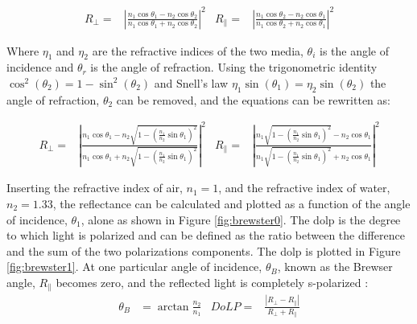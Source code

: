 \begin{align}
    R_\perp =         & \left|{\frac {n_{1}\cos \theta _1-n_{2}\cos \theta _2}{n_{1}\cos \theta _1+n_{2}\cos \theta _2}}\right|^{2}
                      &
    R_\parallel     = & \left|{\frac {n_{1}\cos \theta _2-n_{2}\cos \theta _1}{n_{1}\cos \theta _2+n_{2}\cos \theta _1}}\right|^{2}
\end{align}

Where  $\eta_1$ and $\eta_2$ are the refractive indices of the two media,
$\theta_i$ is the angle of incidence and $\theta_r$ is the angle of refraction.
Using the trigonometric identity $ \cos^2{\left(\theta_2 \right)} = 1- \sin^2{\left(\theta_2 \right)}$ and Snell's law $\eta_1 \sin{\left(\theta_1 \right)} = \eta_2 \sin{\left(\theta_2 \right)}$ the angle of refraction, $\theta_2$ can be removed, and the equations can be rewritten as:

\begin{align}
    R_\perp =         & \left|{\frac {n_{1}\cos \theta _1-n_{2}{\sqrt {1-\left({\frac {n_{1}}{n_{2}}}\sin \theta _1\right)^{2}}}}{n_{1}\cos \theta _1+n_{2}{\sqrt {1-\left({\frac {n_{1}}{n_{2}}}\sin \theta _1\right)^{2}}}}}\right|^{2}
                      &
    R_\parallel     = & \left|{\frac {n_{1}{\sqrt {1-\left({\frac {n_{1}}{n_{2}}}\sin \theta _1\right)^{2}}}-n_{2}\cos \theta _1}{n_{1}{\sqrt {1-\left({\frac {n_{1}}{n_{2}}}\sin \theta _1\right)^{2}}}+n_{2}\cos \theta _1}}\right|^{2}
\end{align}


Inserting the refractive index of air, $n_1 = 1$, and the refractive index of water, $n_2 = 1.33$, the reflectance can be calculated and plotted as a function of the angle of incidence, $\theta_1$, alone as shown in Figure \ref{fig:brewster0}.
The \gls{dolp} is the degree to which light is polarized and can be defined as the ratio between the difference and the sum of the two polarizations components.
The \gls{dolp} is plotted in Figure \ref{fig:brewster1}.
At one particular angle of incidence, $\theta_B$, known as the Brewser angle, $R_\parallel$ becomes zero, and the reflected light is completely s-polarized \cite{BrewsterAngle2024}:
\begin{align}
    \theta_B & = \arctan{\frac{n_2}{n_1}} & DoLP= & \frac{\left | R_\perp - R_\parallel \right |}{R_\perp + R_\parallel}
\end{align}


